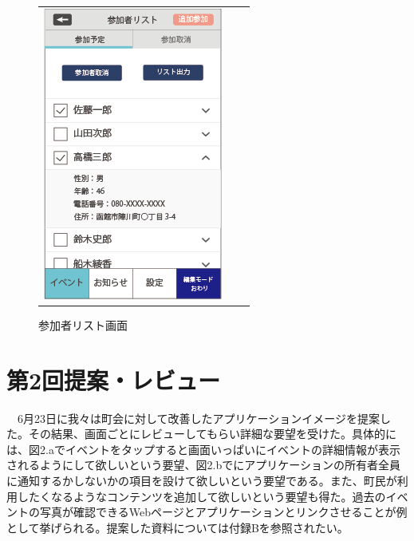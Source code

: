 \begin{figure}[h]
\begin{tabular}{ccc}
\begin{minipage}[t]{0.3\hsize}
        \caption{イベント作成画面}
        \label{joinform}
      \end{minipage}
      \begin{minipage}[t]{0.3\hsize}
        \centering
        \includegraphics[keepaspectratio, scale=0.5]{process_figures/joinlist.png}
        \caption{参加者リスト画面}
        \label{create_event.old}
      \end{minipage}
    \end{tabular}
\end{figure}
\section{第2回提案・レビュー}
　6月23日に我々は町会に対して改善したアプリケーションイメージを提案した。その結果、画面ごとにレビューしてもらい詳細な要望を受けた。具体的には、図2.aでイベントをタップすると画面いっぱいにイベントの詳細情報が表示されるようにして欲しいという要望、図2.bでにアプリケーションの所有者全員に通知するかしないかの項目を設けて欲しいという要望である。また、町民が利用したくなるようなコンテンツを追加して欲しいという要望も得た。過去のイベントの写真が確認できるWebページとアプリケーションとリンクさせることが例として挙げられる。提案した資料については付録Bを参照されたい。
